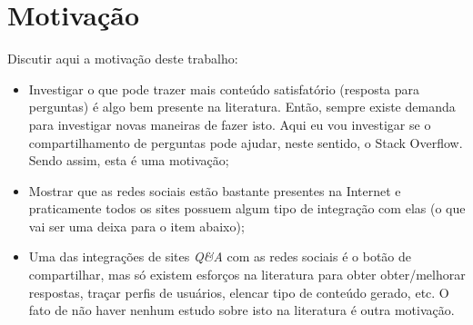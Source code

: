 \section{Motivação}
    Discutir aqui a motivação deste trabalho:
    \begin{itemize}
        \item Investigar o que pode trazer mais conteúdo satisfatório (resposta para perguntas) é algo bem presente na literatura. Então, sempre existe demanda para investigar novas maneiras de fazer isto. Aqui eu vou investigar se o compartilhamento de perguntas pode ajudar, neste sentido, o Stack Overflow. Sendo assim, esta é uma motivação;
        \item Mostrar que as redes sociais estão bastante presentes na Internet e praticamente todos os sites possuem algum tipo de integração com elas (o que vai ser uma deixa para o item abaixo);
        \item Uma das integrações de sites \textit{Q\&A} com as redes sociais é o botão de compartilhar, mas só existem esforços na literatura para obter obter/melhorar respostas, traçar perfis de usuários, elencar tipo de conteúdo gerado, etc. O fato de não haver nenhum estudo sobre isto na literatura é outra motivação.
    \end{itemize}
